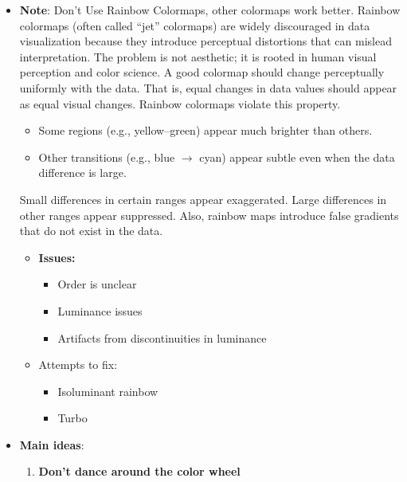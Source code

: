 \documentclass{report}
\begin{document}
\begin{itemize}
        \item \textbf{Note}: Don't Use Rainbow Colormaps, other colormaps work better. Rainbow colormaps (often called “jet” colormaps) are widely discouraged in data visualization because they introduce perceptual distortions that can mislead interpretation. The problem is not aesthetic; it is rooted in human visual perception and color science.
            \bigbreak \noindent 
            A good colormap should change perceptually uniformly with the data. That is, equal changes in data values should appear as equal visual changes.
            \bigbreak \noindent 
            Rainbow colormaps violate this property.
            \begin{itemize}
                \item Some regions (e.g., yellow–green) appear much brighter than others.
                \item Other transitions (e.g., blue $\to$ cyan) appear subtle even when the data difference is large.
            \end{itemize}
            Small differences in certain ranges appear exaggerated. Large differences in other ranges appear suppressed.
            \bigbreak \noindent 
            Also, rainbow maps introduce false gradients that do not exist in the data.
            \begin{itemize}
                \item \textbf{Issues:}
                    \begin{itemize}
                        \item Order is unclear
                        \item Luminance issues
                        \item Artifacts from discontinuities in luminance
                    \end{itemize}
                \item Attempts to fix:
                    \begin{itemize}
                        \item Isoluminant rainbow
                        \item Turbo
                    \end{itemize}
            \end{itemize}
        \item \textbf{Main ideas}:
            \begin{enumerate}
                \item \textbf{Don't dance around the color wheel}

\end{enumerate}
\end{itemize}
\end{document}

